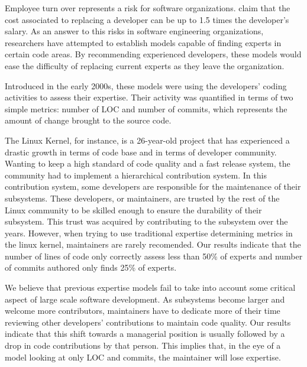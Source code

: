 \label{sec:Introduction}  


Employee turn over represents a risk for software organizations. \citep{turnover} claim that the cost associated to replacing a developer can be up to 1.5 times the developer's salary. As an answer to this risks in software engineering organizations, researchers have attempted to establish models capable of finding experts in certain code areas. By recommending experienced developers, these models would ease the difficulty of replacing current experts as they leave the organization. 


Introduced in the early 2000s\citep{mockus02}\citep{McDonald}, these models were using the developers' coding activities to assess their expertise. Their activity was quantified in terms of two simple metrics: number of \ac{LOC} and number of commits, which represents the amount of change brought to the source code. 

The Linux Kernel, for instance, is a 26-year-old project that has experienced a drastic growth in terms of code base and in terms of developer community. Wanting to keep a high standard of code quality and a fast release system, the community had to implement a hierarchical contribution system. In this contribution system, some developers are responsible for the maintenance of their subsystems. These developers, or maintainers, are trusted by the rest of the Linux community to be skilled enough to ensure the durability of their subsystem. This trust was acquired by contributing to the subsystem over the years. However, when trying to use traditional expertise determining metrics in the linux kernel, maintainers are rarely recomended. Our results indicate that the number of lines of code only correctly assess less than 50\% of experts and number of commits authored only finds 25\% of experts. 


We believe that previous expertise models fail to take into account some critical aspect of large scale software development. As subsystems become larger and welcome more contributors, maintainers have to dedicate more of their time reviewing other developers' contributions to maintain code quality. Our results indicate that this shift towards a managerial position is usually followed by a drop in code contributions by that person. This implies that, in the eye of a model looking at only \ac{LOC} and commits, the maintainer will lose expertise. 


